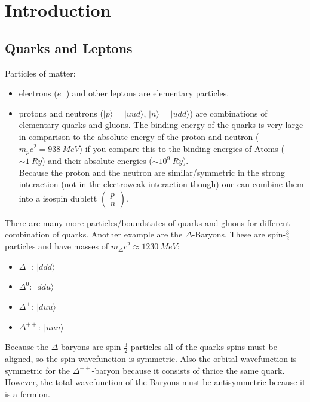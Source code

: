 \documentclass{include/thesisclass}
\newcommand{\rk}{\rangle}
\newcommand{\vektorz}[2]{\begin{pmatrix} #1 \\ #2 \end{pmatrix}}
\begin{document}
    \FrontMatter

    
    
    \begingroup \let\clearpage\relax    %
    \tableofcontents                    %
    \endgroup



    \MainMatter
\chapter{Introduction}
\section{Quarks and Leptons}
Particles of matter:
\begin{itemize}
	\item electrons ($e^-$) and other leptons are elementary particles. 
	\item protons and neutrons ($|p\rk = |uud\rk$, $|n\rk = |udd\rk$) are combinations of elementary quarks and gluons. The binding energy of the quarks is very large in comparison to the absolute energy of the proton and neutron ($m_pc^2 = 938~\si{MeV}$) if you compare this to the binding energies of Atoms ($\sim 1~\si{Ry}$) and their absolute energies ($\sim 10^9~\si{Ry}$).\\
		Because the proton and the neutron are similar/symmetric in the strong interaction (not in the electroweak interaction though) one can combine them into a isospin dublett $\vektorz{p}{n}$.
\end{itemize}
There are many more particles/boundstates of quarks and gluons for different combination of quarks. Another example are the $\Delta$-Baryons. These are spin-$\frac{3}{2}$ particles and have masses of $m_\Delta c^2 \approx 1230 ~\si{MeV}$:
\begin{itemize}
	\item $\Delta^-:~|ddd\rk$
	\item $\Delta^0:~|ddu\rk$
	\item $\Delta^+:~|duu\rk$
	\item $\Delta^{++}:~|uuu\rk$
\end{itemize}
Because the $\Delta$-baryons are spin-$\frac{3}{2}$ particles all of the quarks spins must be aligned, so the spin wavefunction is symmetric. Also the orbital wavefunction is symmetric for the $\Delta^{++}$-baryon because it consists of thrice the same quark. However, the total wavefunction of the Baryons must be antisymmetric because it is a fermion.\\
\end{document}
